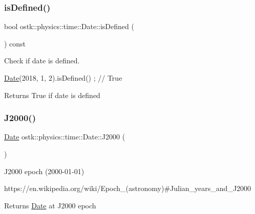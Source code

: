 \subsubsection{\texorpdfstring{is\+Defined()}{isDefined()}}
{\footnotesize\ttfamily bool ostk\+::physics\+::time\+::\+Date\+::is\+Defined (\begin{DoxyParamCaption}{ }\end{DoxyParamCaption}) const}



Check if date is defined. 


\begin{DoxyCode}
\hyperlink{classostk_1_1physics_1_1time_1_1_date_a3ff43a5f7a8ce8350e894b51befeb50d}{Date}(2018, 1, 2).isDefined() ; \textcolor{comment}{// True}
\end{DoxyCode}


\begin{DoxyReturn}{Returns}
True if date is defined 
\end{DoxyReturn}
\mbox{\label{classostk_1_1physics_1_1time_1_1_date_a0291e75d2537f1df98246a811eb24811}} 
\subsubsection{\texorpdfstring{J2000()}{J2000()}}
{\footnotesize\ttfamily \hyperlink{classostk_1_1physics_1_1time_1_1_date}{Date} ostk\+::physics\+::time\+::\+Date\+::\+J2000 (\begin{DoxyParamCaption}{ }\end{DoxyParamCaption})\hspace{0.3cm}{\ttfamily [static]}}



J2000 epoch (2000-\/01-\/01) 

https\+://en.wikipedia.\+org/wiki/\+Epoch\+\_\+(astronomy)\#\+Julian\+\_\+years\+\_\+and\+\_\+\+J2000

\begin{DoxyReturn}{Returns}
\hyperlink{classostk_1_1physics_1_1time_1_1_date}{Date} at J2000 epoch 
\end{DoxyReturn}
\mbox{\label{classostk_1_1physics_1_1time_1_1_date_a1745f88cba99bde5a17c30170b80b1b4}} 
